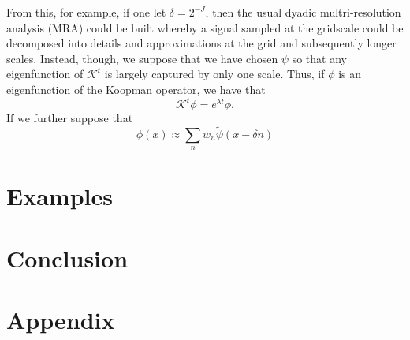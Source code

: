 \documentclass[a4paper,11pt]{article}
\begin{document}
From this, for example, if one let $\delta = 2^{-J}$, then the usual dyadic multri-resolution analysis (MRA) could be built whereby a signal sampled at the gridscale could be decomposed into details and approximations at the grid and subsequently longer scales.  Instead, though, we suppose that we have chosen $\psi$ so that any eigenfunction of $\mathcal{K}^{t}$ is largely captured by only one scale.  Thus, if $\phi$ is an eigenfunction of the Koopman operator, we have that 
\[
\mathcal{K}^{t}\phi = e^{\lambda t}\phi.
\]
If we further suppose that 
\[
\phi(x) \approx \sum_{n}w_{n}\tilde{\psi}\left(x-\delta n \right)
\]
\section*{Examples}

\section*{Conclusion}

\section*{Appendix}



\end{document}

